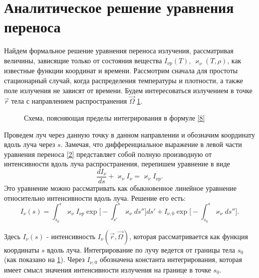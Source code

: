 \section{Аналитическое решение уравнения переноса}
Найдем формальное решение уравнения переноса излучения, рассматривая величины, зависящие только от состояния вещества $I_{\nu p}(T)$, $\varkappa_{\nu}(T, \rho)$, как известные функции координат и времени. Рассмотрим сначала для простоты стационарный случай, когда распределения температуры и плотности, а также поле излучения не зависят от времени. Будем интересоваться излучением в точке $\vec r$ тела с направлением распространения $\vec \Omega$ \ref{fig:2}. 
\begin{figure}[ht!]
\caption{Схема, поясняющая пределы интегрирования в формуле \eqref{8}}
\label{fig:2}
\end{figure}
Проведем луч через данную точку в данном направлении и обозначим координату вдоль луча через $s$. Замечая, что дифференциальное выражение в левой части уравнения переноса \eqref{2} представляет собой полную производную от интенсивности вдоль луча распространения, перепишем уравнение в виде
\begin {equation}
\frac{dI_{\nu}}{ds} + \varkappa_{\nu}I_{\nu} = \varkappa_{\nu}I_{\nu p}.
\end {equation}
Это уравнение можно рассматривать как обыкновенное линейное уравнение относительно интенсивности вдоль луча. Решение его есть:
\begin {equation}
I_{\nu}(s) = \int_{s_0}^s\varkappa_{\nu}I_{\nu p} \exp\Big[-\int_{s'}^s\varkappa_{\nu}ds''\Big]ds' + I_{\nu,0} \exp\Big[-\int_{s_0}^s \varkappa_{\nu}ds''\Big].
\label{8}
\end {equation}

Здесь $I_{\nu}(s)$ - интенсивность $I_{\nu}(\vec r, \vec\Omega)$, которая рассматривается как функция координаты $s$ вдоль луча. Интегрирование по лучу ведется от границы тела $s_0$ (как показано на \ref{fig:2}). Через $I_{\nu, 0}$ обозначена константа интегрирования, которая имеет смысл значения интенсивности излучения на границе в точке $s_0$.

